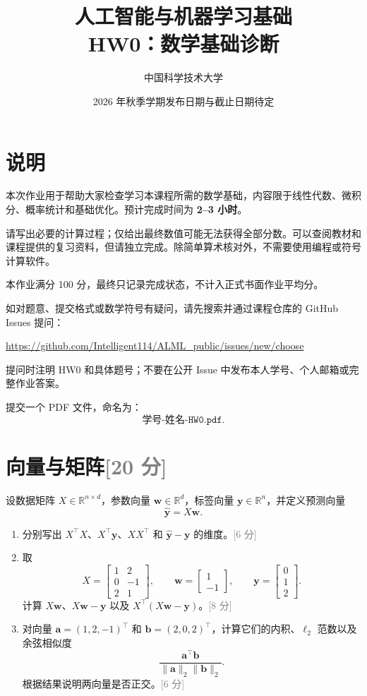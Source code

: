 \documentclass[11pt,a4paper]{article}
\title{\vspace{-1.4cm}\textbf{人工智能与机器学习基础\\HW0：数学基础诊断}}
\author{中国科学技术大学}
\date{2026 年秋季学期\quad 发布日期与截止日期待定}
\newcommand{\R}{\mathbb{R}}
\newcommand{\points}[1]{\hfill\textcolor{gray}{[#1 分]}}
\begin{document}
\maketitle
\pagestyle{fancy}
\thispagestyle{fancy}

\section*{说明}

本次作业用于帮助大家检查学习本课程所需的数学基础，内容限于线性代数、微积分、概率统计和基础优化。预计完成时间为 \textbf{2--3 小时}。

请写出必要的计算过程；仅给出最终数值可能无法获得全部分数。可以查阅教材和课程提供的复习资料，但请独立完成。除简单算术核对外，不需要使用编程或符号计算软件。

本作业满分 100 分，最终只记录完成状态，不计入正式书面作业平均分。

如对题意、提交格式或数学符号有疑问，请先搜索并通过课程仓库的 GitHub Issues 提问：
\begin{center}
    \url{https://github.com/Intelligent114/ALML_public/issues/new/choose}
\end{center}
提问时注明 HW0 和具体题号；不要在公开 Issue 中发布本人学号、个人邮箱或完整作业答案。

提交一个 PDF 文件，命名为：
\[
    \texttt{学号-姓名-HW0.pdf}.
\]

\section{向量与矩阵\texorpdfstring{\points{20}}{（20 分）}}

设数据矩阵 $X\in\R^{n\times d}$，参数向量 $\bm w\in\R^d$，标签向量 $\bm y\in\R^n$，并定义预测向量
\[
    \hat{\bm y}=X\bm w.
\]

\begin{enumerate}
    \item 分别写出 $X^\top X$、$X^\top\bm y$、$XX^\top$ 和 $\hat{\bm y}-\bm y$ 的维度。\points{6}

    \item 取
    \[
        X=\begin{bmatrix}
            1&2\\
            0&-1\\
            2&1
        \end{bmatrix},\qquad
        \bm w=\begin{bmatrix}1\\-1\end{bmatrix},\qquad
        \bm y=\begin{bmatrix}0\\1\\2\end{bmatrix}.
    \]
    计算 $X\bm w$、$X\bm w-\bm y$ 以及 $X^\top(X\bm w-\bm y)$。\points{8}

    \item 对向量 $\bm a=(1,2,-1)^\top$ 和 $\bm b=(2,0,2)^\top$，计算它们的内积、$\ell_2$ 范数以及余弦相似度
    \[
        \frac{\bm a^\top\bm b}{\lVert\bm a\rVert_2\lVert\bm b\rVert_2}.
    \]
    根据结果说明两向量是否正交。\points{6}
\end{enumerate}
\end{document}

